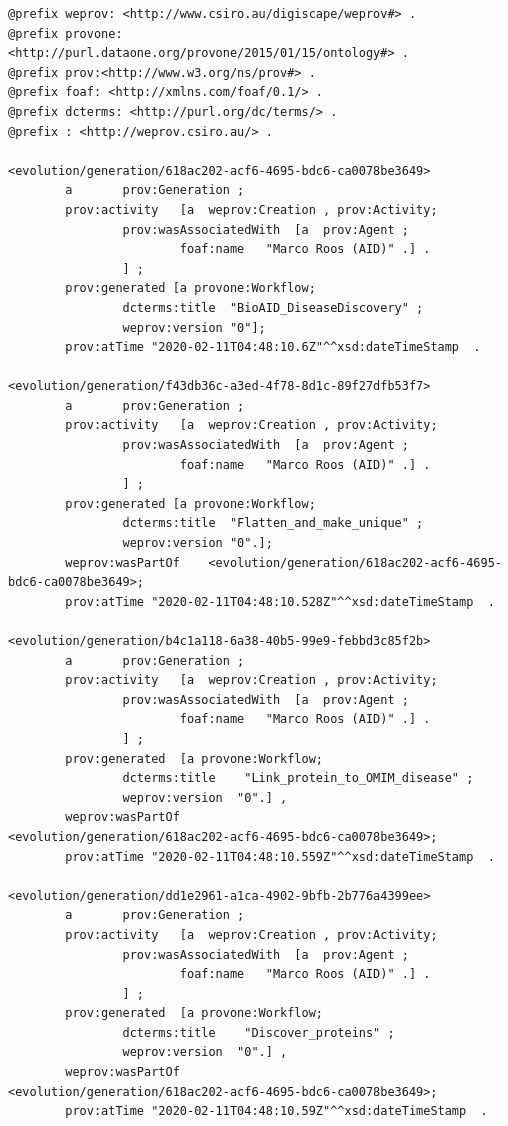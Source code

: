 \documentclass[ao]{iosart2x}
\begin{document}
\begin{lstlisting}[frame=single, caption={BioAIDDiseaseDiscovery workflow creation provenance},label={lst:creation-prov}]
@prefix weprov: <http://www.csiro.au/digiscape/weprov#> .
@prefix provone: <http://purl.dataone.org/provone/2015/01/15/ontology#> .
@prefix prov:<http://www.w3.org/ns/prov#> .
@prefix foaf: <http://xmlns.com/foaf/0.1/> .
@prefix dcterms: <http://purl.org/dc/terms/> .
@prefix : <http://weprov.csiro.au/> .

<evolution/generation/618ac202-acf6-4695-bdc6-ca0078be3649>
        a       prov:Generation ;
        prov:activity   [a  weprov:Creation , prov:Activity;
                prov:wasAssociatedWith  [a  prov:Agent ;
                        foaf:name   "Marco Roos (AID)" .] .
                ] ;
        prov:generated [a provone:Workflow;
                dcterms:title  "BioAID_DiseaseDiscovery" ;
                weprov:version "0"];
        prov:atTime "2020-02-11T04:48:10.6Z"^^xsd:dateTimeStamp  .

<evolution/generation/f43db36c-a3ed-4f78-8d1c-89f27dfb53f7>
        a       prov:Generation ;
        prov:activity   [a  weprov:Creation , prov:Activity;
                prov:wasAssociatedWith  [a  prov:Agent ;
                        foaf:name   "Marco Roos (AID)" .] .
                ] ;
        prov:generated [a provone:Workflow;
                dcterms:title  "Flatten_and_make_unique" ;
                weprov:version "0".];
        weprov:wasPartOf    <evolution/generation/618ac202-acf6-4695-bdc6-ca0078be3649>;
        prov:atTime "2020-02-11T04:48:10.528Z"^^xsd:dateTimeStamp  .

<evolution/generation/b4c1a118-6a38-40b5-99e9-febbd3c85f2b>
        a       prov:Generation ;
        prov:activity   [a  weprov:Creation , prov:Activity;
                prov:wasAssociatedWith  [a  prov:Agent ;
                        foaf:name   "Marco Roos (AID)" .] .
                ] ;
        prov:generated  [a provone:Workflow;
                dcterms:title    "Link_protein_to_OMIM_disease" ;
                weprov:version  "0".] ,
        weprov:wasPartOf                <evolution/generation/618ac202-acf6-4695-bdc6-ca0078be3649>;
        prov:atTime "2020-02-11T04:48:10.559Z"^^xsd:dateTimeStamp  .

<evolution/generation/dd1e2961-a1ca-4902-9bfb-2b776a4399ee>
        a       prov:Generation ;
        prov:activity   [a  weprov:Creation , prov:Activity;
                prov:wasAssociatedWith  [a  prov:Agent ;
                        foaf:name   "Marco Roos (AID)" .] .
                ] ;
        prov:generated  [a provone:Workflow;
                dcterms:title    "Discover_proteins" ;
                weprov:version  "0".] ,
        weprov:wasPartOf                <evolution/generation/618ac202-acf6-4695-bdc6-ca0078be3649>;
        prov:atTime "2020-02-11T04:48:10.59Z"^^xsd:dateTimeStamp  .


\end{lstlisting}
\end{document}
